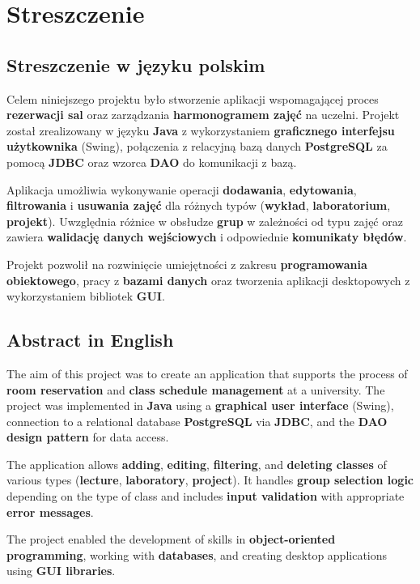 \chapter{Streszczenie}

\section{Streszczenie w języku polskim}

Celem niniejszego projektu było stworzenie aplikacji wspomagającej proces \textbf{rezerwacji sal} oraz zarządzania \textbf{harmonogramem zajęć} na uczelni. Projekt został zrealizowany w języku \textbf{Java} z wykorzystaniem \textbf{graficznego interfejsu użytkownika} (Swing), połączenia z relacyjną bazą danych \textbf{PostgreSQL} za pomocą \textbf{JDBC} oraz wzorca \textbf{DAO} do komunikacji z bazą.

Aplikacja umożliwia wykonywanie operacji \textbf{dodawania}, \textbf{edytowania}, \textbf{filtrowania} i \textbf{usuwania zajęć} dla różnych typów (\textbf{wykład}, \textbf{laboratorium}, \textbf{projekt}). Uwzględnia różnice w obsłudze \textbf{grup} w zależności od typu zajęć oraz zawiera \textbf{walidację danych wejściowych} i odpowiednie \textbf{komunikaty błędów}.

Projekt pozwolił na rozwinięcie umiejętności z zakresu \textbf{programowania obiektowego}, pracy z \textbf{bazami danych} oraz tworzenia aplikacji desktopowych z wykorzystaniem bibliotek \textbf{GUI}.

\section{Abstract in English}

The aim of this project was to create an application that supports the process of \textbf{room reservation} and \textbf{class schedule management} at a university. The project was implemented in \textbf{Java} using a \textbf{graphical user interface} (Swing), connection to a relational database \textbf{PostgreSQL} via \textbf{JDBC}, and the \textbf{DAO design pattern} for data access.

The application allows \textbf{adding}, \textbf{editing}, \textbf{filtering}, and \textbf{deleting classes} of various types (\textbf{lecture}, \textbf{laboratory}, \textbf{project}). It handles \textbf{group selection logic} depending on the type of class and includes \textbf{input validation} with appropriate \textbf{error messages}.

The project enabled the development of skills in \textbf{object-oriented programming}, working with \textbf{databases}, and creating desktop applications using \textbf{GUI libraries}.
